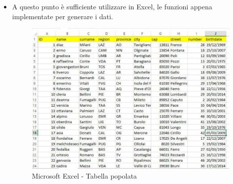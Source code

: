 \begin{itemize}
\begin{lstlisting}[language={[Visual]Basic}]
Function random_name()  
	a = Rnd()
	b = Range("a50").Value
	x = 50 + Int(a * b)
	r = Range("B" & CStr(x))
	random_name = r  
End Function  

Function random_surname()  
    a = Rnd()    
    b = Range("d50").Value    
    x = 50 + Int(a * b)   
    r = Range("E" & CStr(x))    
    random_surname = r  
End Function  

Function random_date_between(x, y) As Date         
	a = Rnd()    
	b = DateDiff("d", x, y)    
	r = CDate(x) + CDate(Int(a * b))   
	random_date_between = r     
End Function  

Function cap(x)
	i = 50 For Each c In [i50:i8141]    
		If c.Value = x.Value Then
			y = i
	i = i + 1
	Next
	cap = Range("h" & CStr(y)).Value  
End Function 
     
Function random_city()  
    a = Rnd()    
    b = Range("g50").Value    
    x = 50 + Int(a * b)    
    r = Range("i" & CStr(x))    
    random_city = r  
End Function  

Function random_region()  
    a = Rnd()    
    b = Range("n50").Value   
    x = 50 + Int(a * b)    
    r = Range("o" & CStr(x))    
    random_region = r  
End Function 
 
Function random_province()  
    a = Rnd()    
    b = Range("k50").Value    
    x = 50 + Int(a * b)    
    r = Range("l" & CStr(x))    
    random_province = r  
End Function

\end{lstlisting}

\textbf{Bisogna fare attenzione agli indici delle celle utilizzati, se le liste sono state inserite in una posizione differente, è necessario aggiornare gli indici nelle funzioni che sono scritte sopra}.

\item  A questo punto è sufficiente utilizzare in Excel, le funzioni appena implementate per generare i dati.  

\begin{center}
\begin{figure}[H]
\centering
\includegraphics[scale=1]{figures/excel_populated.png}
\caption{Microsoft Excel - Tabella popolata} 
\end{figure}
\end{center}


\end{itemize}
